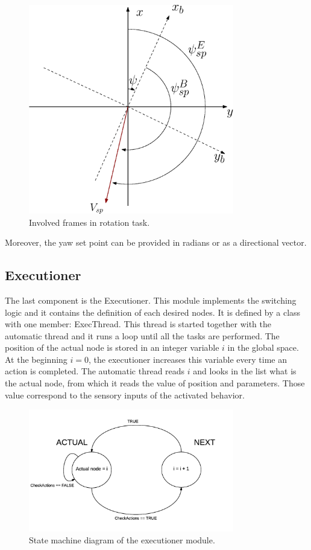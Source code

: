 \begin{figure}[h]
\centering
 \includegraphics[width=0.8\textwidth]{rotate.eps}
 \caption{Involved frames in rotation task.}
  \label{figure:rotate}
\end{figure}
Moreover, the yaw set point can be provided in radians or  as a directional vector.


\subsection {Executioner}
\label{sec:exec}
The last component is the Executioner. This module implements the switching logic and it contains the definition of each desired nodes. It is defined by a class with one member: ExecThread. This thread is started together with the automatic thread and it runs a loop until all the tasks are performed. The position of the actual node is stored in an integer variable $i$ in the global space. At the beginning $i = 0$, the executioner increases this variable every time an action is completed. The automatic thread reads $i$ and looks in the list what is the actual node, from which it reads the value of position and parameters. Those value correspond to the sensory inputs of the activated behavior.

\begin{figure}[h]
\centering
 \includegraphics[width=0.8\textwidth]{executioner.png}
 \caption[Executioner sate machine.]{State machine diagram of the executioner module.}
  \label{figure:exec}
\end{figure}


